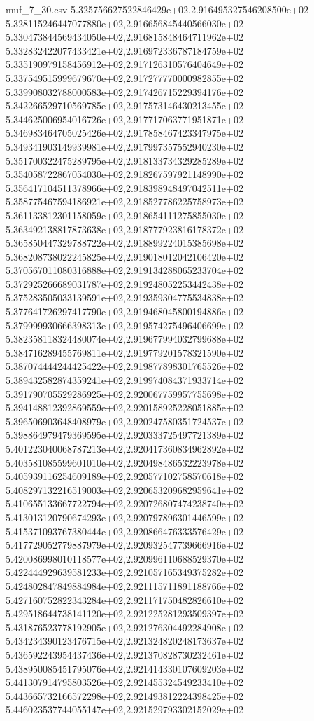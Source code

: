 \begin{filecontents*}{muf_7_30.csv}
5.325756627522846429e+02,2.916495327546208500e+02
5.328115246447077880e+02,2.916656845440566030e+02
5.330473844569434050e+02,2.916815848464711962e+02
5.332832422077433421e+02,2.916972336787184759e+02
5.335190979158456912e+02,2.917126310576404649e+02
5.337549515999679670e+02,2.917277770000982855e+02
5.339908032788000583e+02,2.917426715229394176e+02
5.342266529710569785e+02,2.917573146430213455e+02
5.344625006954016726e+02,2.917717063771951871e+02
5.346983464705025426e+02,2.917858467423347975e+02
5.349341903149939981e+02,2.917997357552940230e+02
5.351700322475289795e+02,2.918133734329285289e+02
5.354058722867054030e+02,2.918267597921148990e+02
5.356417104511378966e+02,2.918398948497042511e+02
5.358775467594186921e+02,2.918527786225758973e+02
5.361133812301158059e+02,2.918654111275855030e+02
5.363492138817873638e+02,2.918777923816178372e+02
5.365850447329788722e+02,2.918899224015385698e+02
5.368208738022245825e+02,2.919018012042106420e+02
5.370567011080316888e+02,2.919134288065233704e+02
5.372925266689031787e+02,2.919248052253442438e+02
5.375283505033139591e+02,2.919359304775534838e+02
5.377641726297417790e+02,2.919468045800194886e+02
5.379999930666398313e+02,2.919574275496406699e+02
5.382358118324480074e+02,2.919677994032799688e+02
5.384716289455769811e+02,2.919779201578321590e+02
5.387074444244425422e+02,2.919877898301765526e+02
5.389432582874359241e+02,2.919974084371933714e+02
5.391790705529286925e+02,2.920067759957755698e+02
5.394148812392869559e+02,2.920158925228051885e+02
5.396506903648408979e+02,2.920247580351724537e+02
5.398864979479369595e+02,2.920333725497721389e+02
5.401223040068787213e+02,2.920417360834962892e+02
5.403581085599601010e+02,2.920498486532223978e+02
5.405939116254609189e+02,2.920577102758570618e+02
5.408297132216519003e+02,2.920653209682959641e+02
5.410655133667722794e+02,2.920726807474238740e+02
5.413013120790674293e+02,2.920797896301446599e+02
5.415371093767380444e+02,2.920866476333576429e+02
5.417729052779887979e+02,2.920932547739666916e+02
5.420086998010118577e+02,2.920996110688529370e+02
5.422444929639581233e+02,2.921057165349375282e+02
5.424802847849884984e+02,2.921115711891188766e+02
5.427160752822343284e+02,2.921171750482826610e+02
5.429518644738141120e+02,2.921225281293509397e+02
5.431876523778192905e+02,2.921276304492284908e+02
5.434234390123476715e+02,2.921324820248173637e+02
5.436592243954437436e+02,2.921370828730232461e+02
5.438950085451795076e+02,2.921414330107609203e+02
5.441307914795803526e+02,2.921455324549233410e+02
5.443665732166572298e+02,2.921493812224398425e+02
5.446023537744055147e+02,2.921529793302152029e+02

\end{filecontents*}
